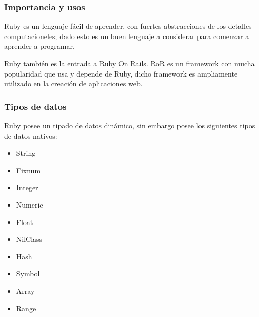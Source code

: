 \documentclass{beamer}
\begin{document}

\begin{frame}
\frametitle{Importancia y usos}
Ruby es un lenguaje f\'acil de aprender, con fuertes abstracciones de los detalles computacioneles; dado esto es un buen lenguaje a considerar para comenzar a aprender a programar.

Ruby tambi\'en es la entrada a Ruby On Rails. RoR es un framework con mucha popularidad que usa y depende de Ruby, dicho framework es ampliamente utilizado en la creaci\'on de aplicaciones web.
\end{frame}


\begin{frame}
\frametitle{Tipos de datos}
Ruby posee un tipado de datos din\'amico, sin embargo posee los siguientes tipos de datos nativos:
\begin{itemize}
  \item String
  \item Fixnum
  \item Integer
  \item Numeric
  \item Float
  \item NilClass
  \item Hash
  \item Symbol
  \item Array
  \item Range
\end{itemize}
\end{frame}

\end{document}
